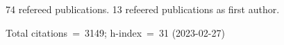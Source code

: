 74 refereed publications. 13 refeered publications as first author.

Total citations~=~3149; h-index~=~31 (2023-02-27)